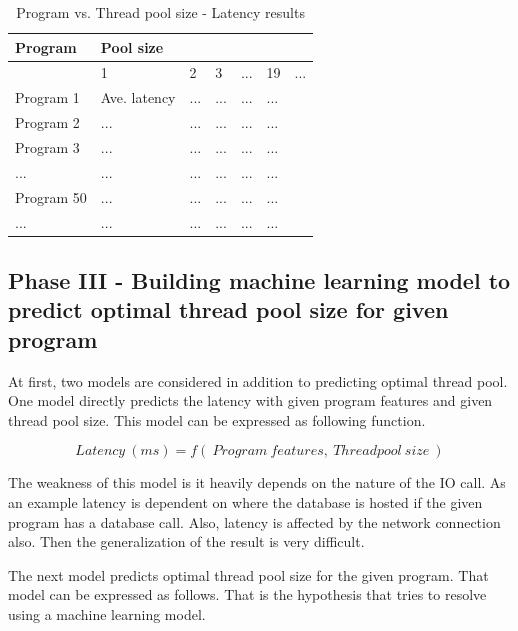 \begin{table}[]
	\caption{Program vs. Thread pool size - Latency results }
	\begin{center}
	\begin{tabular}{|l|l|l|l|l|l|l|}
		\hline
		Program    & \multicolumn{6}{l|}{Pool size}        \\ \hline
		& 1            & 2 & 3 & ... & 19 & ... \\ \hline
		Program 1  & Ave. latency    & ...  & ...  & ...  &... &     \\ \hline
		Program 2  &      ...        & ...  & ...  & ...  &... &     \\ \hline
		Program 3  &      ...        & ...  & ...  & ...  &... &     \\ \hline
		...        &      ...        & ...  & ...  & ...  &... &     \\ \hline
		Program 50 &      ...        & ...  & ...  & ...  &... &     \\ \hline
		...        &      ...        & ...  & ...  & ...  &... &     \\ \hline
	\end{tabular}
	\end{center}
	\label{tab:pool_size_latency}
\end{table}

\subsection{Phase III - Building machine learning model to predict optimal thread pool size for given program}\label{sub:phase3}

At first, two models are considered in addition to predicting optimal thread pool. One model directly predicts the latency with given program features and given thread pool size. This model can be expressed as following function. 

$$ Latency \:(ms) = f(\:Program\:features,\:Threadpool\:size\:)$$

The weakness of this model is it heavily depends on the nature of the IO call. As an example latency is dependent on where the database is hosted if the given program has a database call. Also, latency is affected by the network connection also. Then the generalization of the result is very difficult.

The next model predicts optimal thread pool size for the given program. That model can be expressed as follows. That is the hypothesis that tries to resolve using a machine learning model. 

